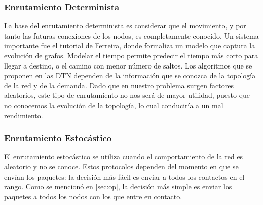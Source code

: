 \documentclass[10pt,preprint,onecolumn]{paper}
\begin{document}
\subsubsection{Enrutamiento Determinista}

La base del enrutamiento determinista es considerar que el movimiento, y por tanto las futuras conexiones de los nodos, es completamente conocido. Un sistema importante fue el tutorial de Ferreira\cite{graphs}, donde formaliza un modelo que captura la evolución de grafos. Modelar el tiempo permite predecir el tiempo más corto para llegar a destino, o el camino con menor número de saltos.
Los algoritmos que se proponen en las DTN dependen de la información que se conozca de la topología de la red y de la demanda\cite{16}. Dado que en nuestro problema surgen factores aleatorios, este tipo de enrutamiento no nos será de mayor utilidad, puesto que no conocemos la evolución de la topología, lo cual conduciría a un mal rendimiento.

\subsubsection{Enrutamiento Estocástico}

El enrutamiento estocástico se utiliza cuando el comportamiento de la red es aleatorio y no se conoce. Estos protocolos dependen del momento en que se envían los paquetes: la decisión más fácil es enviar a todos los contactos en el rango.
Como se mencionó en \ref{sec:op}, la decisión más simple es enviar los paquetes a todos los nodos con los que entre en contacto.
\end{document}
